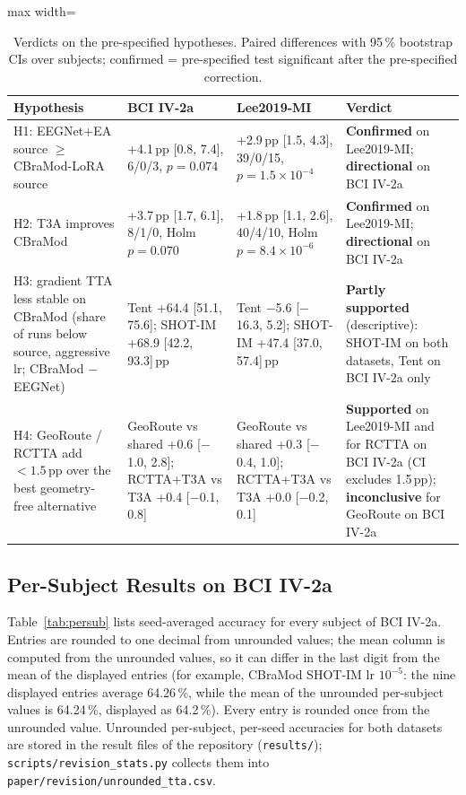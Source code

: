 \documentclass[preprint,12pt]{elsarticle}
\newcommand{\rev}[1]{#1}
\newcommand{\revfloat}{}
\begin{document}
\begin{table}[!htbp]
\centering
\caption{Verdicts on the pre-specified hypotheses. Paired differences with 95\,\% bootstrap CIs over subjects; confirmed = pre-specified test significant after the pre-specified correction.}
\label{tab:hyp}
\revfloat
\setlength{\tabcolsep}{4pt}
\begin{adjustbox}{max width=\textwidth}
\begin{tabular}{@{}>{\raggedright\arraybackslash}p{3.4cm}>{\raggedright\arraybackslash}p{4.4cm}>{\raggedright\arraybackslash}p{4.4cm}>{\raggedright\arraybackslash}p{4.4cm}@{}}
\toprule
Hypothesis & BCI IV-2a & Lee2019-MI & Verdict \\
\midrule
H1: EEGNet+EA source $\ge$ CBraMod-LoRA source & +4.1\,pp [0.8, 7.4], 6/0/3, $p=0.074$ & +2.9\,pp [1.5, 4.3], 39/0/15, $p=1.5{\times}10^{-4}$ & \textbf{Confirmed} on Lee2019-MI; \textbf{directional} on BCI IV-2a \\
H2: T3A improves CBraMod & +3.7\,pp [1.7, 6.1], 8/1/0, Holm $p=0.070$ & +1.8\,pp [1.1, 2.6], 40/4/10, Holm $p=8.4{\times}10^{-6}$ & \textbf{Confirmed} on Lee2019-MI; \textbf{directional} on BCI IV-2a \\
H3: gradient TTA less stable on CBraMod (share of runs below source, aggressive lr; CBraMod $-$ EEGNet) & Tent +64.4 [51.1, 75.6]; SHOT-IM +68.9 [42.2, 93.3]\,pp & Tent $-$5.6 [$-$16.3, 5.2]; SHOT-IM +47.4 [37.0, 57.4]\,pp & \textbf{Partly supported} (descriptive): SHOT-IM on both datasets, Tent on BCI IV-2a only \\
H4: GeoRoute / RCTTA add $<1.5$\,pp over the best geometry-free alternative & GeoRoute vs shared +0.6 [$-$1.0, 2.8]; RCTTA+T3A vs T3A +0.4 [$-$0.1, 0.8] & GeoRoute vs shared +0.3 [$-$0.4, 1.0]; RCTTA+T3A vs T3A +0.0 [$-$0.2, 0.1] & \textbf{Supported} on Lee2019-MI and for RCTTA on BCI IV-2a (CI excludes 1.5\,pp); \textbf{inconclusive} for GeoRoute on BCI IV-2a \\
\bottomrule
\end{tabular}
\end{adjustbox}
\end{table}



\subsection{Per-Subject Results on BCI IV-2a}
Table~\ref{tab:persub} lists seed-averaged accuracy for every subject of BCI IV-2a. \rev{Entries are rounded to one decimal from unrounded values; the mean column is computed from the unrounded values, so it can differ in the last digit from the mean of the displayed entries (for example, CBraMod SHOT-IM lr $10^{-5}$: the nine displayed entries average 64.26\,\%, while the mean of the unrounded per-subject values is 64.24\,\%, displayed as 64.2\,\%). Every entry is rounded once from the unrounded value. Unrounded per-subject, per-seed accuracies for both datasets are stored in the result files of the repository (\texttt{results/}); \texttt{scripts/revision\_stats.py} collects them into \texttt{paper/revision/unrounded\_tta.csv}.}
\end{document}
